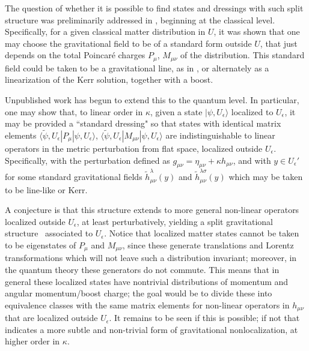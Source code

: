 The question of whether it is possible to find states and dressings with such split structure was preliminarily addressed in \DoGithree, beginning at the classical level.  Specifically, for a given classical matter distribution in $U$, it was shown that one may choose the gravitational field to be of a standard form outside $U$, that just depends on the total Poincar\'e charges $P_\mu$, $M_{\mu \nu}$ of the distribution.  This standard field could be taken to be a gravitational line, as in \DoGione, or alternately as a linearization of the Kerr solution, together with a boost.

Unpublished work has begun to extend this to the quantum level.  In particular, one may show that, to linear order in $\kappa$, given a state 
$|\psi,U_\epsilon\rangle$ localized to $U_\epsilon$, it may be provided a ``standard dressing" so that states with identical matrix elements $\langle \tilde \psi,U_\epsilon|  P_\mu |\psi,U_\epsilon \rangle$, $\langle \tilde \psi,U_\epsilon|  M_{\mu\nu} |\psi,U_\epsilon \rangle$ are indistinguishable to linear operators in the metric perturbation from flat space, localized outside $U_\epsilon$.  Specifically, with the perturbation defined as $g_{\mu\nu}= \eta_{\mu\nu}+\kappa h_{\mu\nu}$, and with $y\in U_\epsilon'$
%
\eqn{}
%
for some standard gravitational fields ${\tilde h}_{\mu\nu}^\lambda(y)$ and ${\tilde h}_{\mu\nu}^{\lambda\sigma}(y)$ which may be taken to be line-like or Kerr.

A conjecture is that this structure extends to more general non-linear operators localized outside $U_\epsilon$, at least perturbatively, yielding a split gravitational structure \splstr\ associated to $U_\epsilon$.  Notice that localized matter states cannot be taken to be eigenstates of $P_\mu$ and $M_{\mu\nu}$, since these generate translations and Lorentz transformations which will not leave such a distribution invariant; moreover, in the quantum theory these generators do not commute.  This means that in general these localized states have nontrivial distributions of momentum and angular momentum/boost charge; the goal would be to divide these into equivalence classes with the same matrix elements for non-linear operators in $h_{\mu\nu}$ that are localized outside $U_\epsilon$.  It remains to be seen if this is possible; if not that indicates a more subtle and non-trivial form of gravitational nonlocalization, at higher order in $\kappa$.

